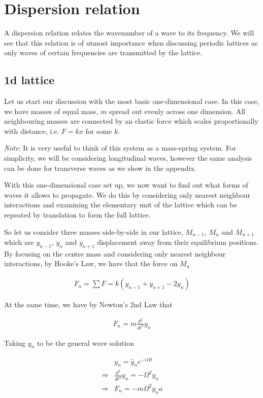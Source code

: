 \chapter{Dispersion relation}
A dispersion relation relates the wavenumber of a wave to its frequency. We
will see that this relation is of utmost importance when discussing periodic
lattices as only waves of certain frequencies are transmitted by the lattice.

\section{1d lattice}
Let us start our discussion with the most basic one-dimensional case. In this
case, we have masses of equal mass, $m$ spread out evenly across one dimension.
All neighbouring masses are connected by an elastic force which scales
proportionally with distance, i.e. $F = kx$ for some $k$.

\textit{Note}: It is very useful to think of this system as a mass-spring
system. For simplicity, we will be considering longitudinal waves, however the
same analysis can be done for transverse waves as we show in the appendix.

With this one-dimensional case set up, we now want to find out what forms of
waves it allows to propagate. We do this by considering only nearest neighbour
interactions and examining the elementary unit of the lattice which can be
repeated by translation to form the full lattice.

So let us consider three masses side-by-side in our lattice, $M_{n-1}$, $M_n$
and $M_{n+1}$ which are $y_{n-1}$, $y_n$ and $y_{n+1}$ displacement away from
their equilibrium positions. By focusing on the centre mass and considering
only nearest neighbour interactions, by Hooke's Law, we have that the force on
$M_n$

\begin{align}
  F_{n}=\sum F=k\left(y_{n-1}+y_{n+1}-2y_{n}\right) \label{eq:HL}
\end{align}

At the same time, we have by Newton's 2nd Law that

\begin{align}
  F_{n}=m\frac{d^{2}}{dt^{2}}y_{n}
\end{align}

Taking $y_n$ to be the general wave solution

\begin{align}
  &y_{n}=\hat{y}_{n}e^{-i\Omega t} \\
  \Rightarrow &\frac{d^{2}}{dt^{2}}y_{n}=-\Omega^{2}y_{n} \\
  \Rightarrow &F_{n}=-m\Omega^{2}y_{n}a \label{eq:N2L}
\end{align}

